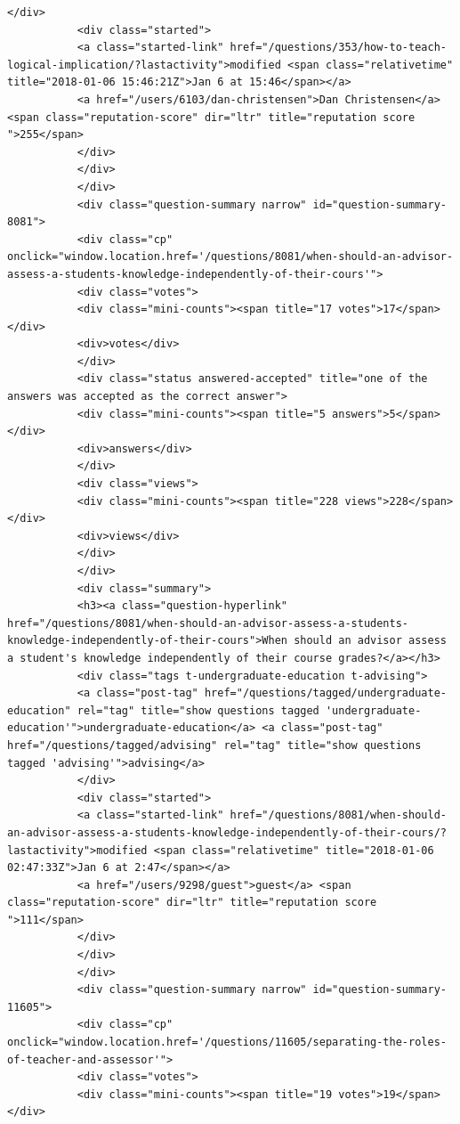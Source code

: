 \documentclass[11pt]{article}
\begin{document}
\begin{Verbatim}[commandchars=\\\{\}]
           </div>
           <div class="started">
           <a class="started-link" href="/questions/353/how-to-teach-logical-implication/?lastactivity">modified <span class="relativetime" title="2018-01-06 15:46:21Z">Jan 6 at 15:46</span></a>
           <a href="/users/6103/dan-christensen">Dan Christensen</a> <span class="reputation-score" dir="ltr" title="reputation score ">255</span>
           </div>
           </div>
           </div>
           <div class="question-summary narrow" id="question-summary-8081">
           <div class="cp" onclick="window.location.href='/questions/8081/when-should-an-advisor-assess-a-students-knowledge-independently-of-their-cours'">
           <div class="votes">
           <div class="mini-counts"><span title="17 votes">17</span></div>
           <div>votes</div>
           </div>
           <div class="status answered-accepted" title="one of the answers was accepted as the correct answer">
           <div class="mini-counts"><span title="5 answers">5</span></div>
           <div>answers</div>
           </div>
           <div class="views">
           <div class="mini-counts"><span title="228 views">228</span></div>
           <div>views</div>
           </div>
           </div>
           <div class="summary">
           <h3><a class="question-hyperlink" href="/questions/8081/when-should-an-advisor-assess-a-students-knowledge-independently-of-their-cours">When should an advisor assess a student's knowledge independently of their course grades?</a></h3>
           <div class="tags t-undergraduate-education t-advising">
           <a class="post-tag" href="/questions/tagged/undergraduate-education" rel="tag" title="show questions tagged 'undergraduate-education'">undergraduate-education</a> <a class="post-tag" href="/questions/tagged/advising" rel="tag" title="show questions tagged 'advising'">advising</a>
           </div>
           <div class="started">
           <a class="started-link" href="/questions/8081/when-should-an-advisor-assess-a-students-knowledge-independently-of-their-cours/?lastactivity">modified <span class="relativetime" title="2018-01-06 02:47:33Z">Jan 6 at 2:47</span></a>
           <a href="/users/9298/guest">guest</a> <span class="reputation-score" dir="ltr" title="reputation score ">111</span>
           </div>
           </div>
           </div>
           <div class="question-summary narrow" id="question-summary-11605">
           <div class="cp" onclick="window.location.href='/questions/11605/separating-the-roles-of-teacher-and-assessor'">
           <div class="votes">
           <div class="mini-counts"><span title="19 votes">19</span></div>

\end{Verbatim}
\end{document}
